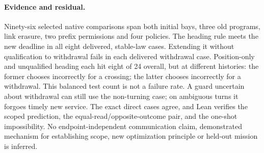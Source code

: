 \documentclass[11pt]{article}
\begin{document}
\paragraph{Evidence and residual.}
Ninety-six selected native comparisons span both initial bays,
three old programs, link erasure, two prefix permissions and four
policies. The heading rule meets the new deadline in all eight
delivered, stable-law cases. Extending it without qualification to
withdrawal fails in each delivered withdrawal case. Position-only
and unqualified heading each hit eight of 24 overall, but at different
histories: the former chooses incorrectly for a crossing; the latter
chooses incorrectly for a withdrawal. This balanced test count is not
a failure rate. A guard uncertain about withdrawal can still use
the non-turning case; on ambiguous turns it forgoes timely new service.
The exact direct cases agree, and Lean verifies the scoped prediction,
the equal-read/opposite-outcome pair, and the one-shot impossibility.
No endpoint-independent communication claim, demonstrated mechanism
for establishing scope, new optimization principle or held-out
mission is inferred.
\end{document}

